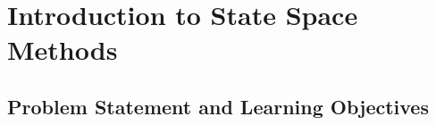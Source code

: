 %
%
%

\chapter{Introduction to State Space Methods}

\section{Problem Statement and Learning Objectives}


\section{}
\section{}
\section{}
\section{}
\section{}
\section{}
\section{}
\section{}
\section{}



